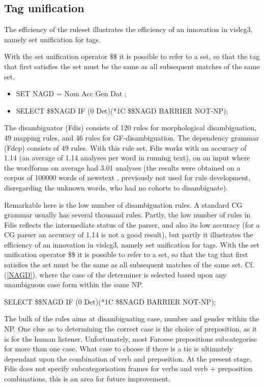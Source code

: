 \documentclass{article}
\begin{document}
\subsection{Tag unification}

The efficiency of the ruleset illustrates the efficiency of an innovation in vislcg3, namely set unification for tags. 

With the set unification operator $\$\$$ it is possible to refer to a set, so that the tag that first satisfies the set must be the same as all subsequent matches of the same set.

\begin{itemize}
\item SET NAGD = Nom Acc Gen Dat ;
\item SELECT \$\$NAGD IF (0 Det)(*1C \$\$NAGD BARRIER NOT-NP);
\end{itemize}



The disambiguator (Fdis) consists of 120 rules for morphological disambiguation, 49 mapping rules, and 46 rules for GF-disambiguation. The dependency grammar (Fdep) consists of 49 rules. With this rule set, Fdis works with an accuracy of 1.14 (an average of 1.14 analyses per word in running text), on an input where the wordforms on average had 3.01 analyses (the results were obtained on a corpus of 100000 words of newstext , previously not used for rule development, disregarding the unknown words, who had no cohorts to disambiguate).

Remarkable here is the low number of disambiguation rules. A standard CG grammar usually has several thousand rules. Partly, the low number of rules in Fdis reflects the intermediate status of the parser, and also its low accuracy (for a CG parser an accuracy of 1.14 is not a good result), but partly it illustrates the efficiency of an innovation in vislcg3, namely set unification for tags. With the set unification operator \$\$ it is possible to refer to a set, so that the tag that first satisfies the set must be the same as all subsequent matches of the same set. Cf. (\ref{NAGD}), where the case of the determiner is selected based upon any unambiguous case form within the same NP.

\begin{example}\label{NAGD}
SELECT \$\$NAGD IF (0 Det)(*1C \$\$NAGD BARRIER NOT-NP);
\end{example}

The bulk of the rules aims at disambiguating case, number and gender within the NP. One clue as to determining the correct case is the choice of preposition, as it is for the human listener. Unfortunately, most Faroese prepositions subcategorise for more than one case. What case to choose if there is a tie is ultimately dependant upon the combination of verb and preposition. At the present stage, Fdis does not specify subcategorisation frames for verbs and verb + preposition combinations, this is an area for future improvement.
\end{document}
